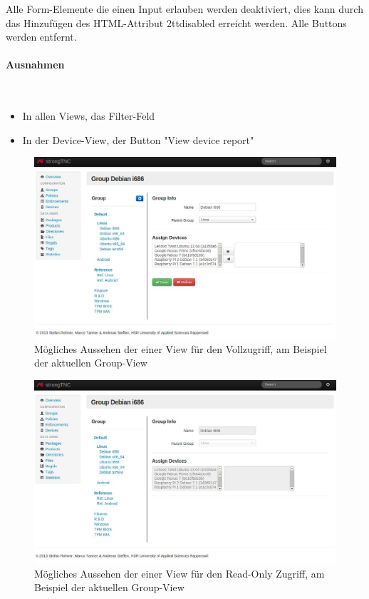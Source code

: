 Alle Form-Elemente die einen Input erlauben werden deaktiviert, dies kann durch das 
Hinzufügen des HTML-Attribut \text2tt{disabled} erreicht werden. Alle Buttons werden entfernt.

\paragraph{Ausnahmen} \hspace{0pt} \\
\begin{itemize}
    \item In allen Views, das Filter-Feld
    \item In der Device-View, der Button "View device report"
\end{itemize}

\begin{figure}[H]
	\centering
	\includegraphics[width=\textwidth]{images/rollen-konzept/group-view-admin.jpg}
	\caption{Mögliches Aussehen der einer View für den Vollzugriff, am Beispiel der aktuellen Group-View}
\end{figure}

\begin{figure}[H]
	\centering
	\includegraphics[width=\textwidth]{images/rollen-konzept/group-view-read-only.jpg}
	\caption{Mögliches Aussehen der einer View für den Read-Only Zugriff, am Beispiel der aktuellen Group-View}
\end{figure}



